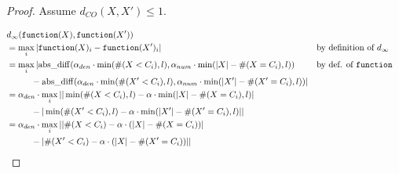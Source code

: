 \documentclass{article}
\begin{document}
\begin{proof}
Assume $d_{CO}(X, X') \le 1$. 

\begin{align*}
    &d_\infty(\texttt{function}(X), \texttt{function}(X')) \\
    &= \max\limits_{i} |\texttt{function}(X)_i - \texttt{function}(X')_i| &&\text{by definition of } d_\infty \\
    &= \max\limits_{i} |\mathrm{abs\_diff}(\alpha_{den} \cdot \min(\#(X < C_i), l), \alpha_{num} \cdot \min(|X| - \#(X = C_i), l)) &&\text{by def. of } \texttt{function}
        \\&\hspace{1cm} -\mathrm{abs\_diff}(\alpha_{den} \cdot \min(\#(X' < C_i), l), \alpha_{num} \cdot \min(|X'| - \#(X' = C_i), l))| \\
    &= \alpha_{den} \cdot \max\limits_{i} ||\min(\#(X < C_i), l) - \alpha \cdot \min(|X| - \#(X = C_i), l)|
        \\&\hspace{1cm}-|\min(\#(X' < C_i), l) - \alpha \cdot \min(|X'| - \#(X' = C_i), l)|| \\
    &= \alpha_{den} \cdot \max\limits_{i} ||\#(X < C_i) - \alpha \cdot (|X| - \#(X = C_i))|
        \\&\hspace{1cm}-|\#(X' < C_i) - \alpha \cdot (|X| - \#(X' = C_i))|| \\
\end{align*}


\end{proof}
\end{document}
